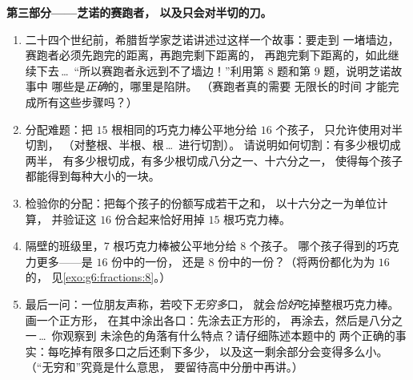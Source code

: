 \begin{problem}
\medskip
\noindent\textbf{第三部分——芝诺的赛跑者，
以及只会对半切的刀。}
\begin{enumerate}[resume]
  \item 二十四个世纪前，希腊哲学家芝诺讲述过这样一个故事：要走到
        一堵墙边，赛跑者必须先跑完的距离，再跑完剩下距离的，
        再跑完剩下距离的，如此继续下去\,\dots\
        “所以赛跑者永远到不了墙边！”利用第 8 题和第 9 题，说明芝诺故事中
        哪些是\emph{正确}的，哪里是陷阱。
        （赛跑者真的需要
        无限长的时间
        才能完成所有这些步骤吗？）
  \item 分配难题：把 $15$ 根相同的巧克力棒公平地分给 $16$ 个孩子，
        只允许使用对半切割，
        （对整根、半根、根\,\dots\ 进行切割）。
        请说明如何切割：有多少根切成两半，
        有多少根切成，有多少根切成八分之一、十六分之一，
        使得每个孩子都能得到每种大小的一块。
  \item 检验你的分配：把每个孩子的份额写成若干之和，
        以十六分之一为单位计算，
        并验证这 $16$ 份合起来恰好用掉 $15$ 根巧克力棒。
  \item 隔壁的班级里，$7$ 根巧克力棒被公平地分给 $8$ 个孩子。
        哪个孩子得到的巧克力更多——是 $16$ 份中的一份，
        还是 $8$ 份中的一份？（将两份都化为为 $16$ 的，
        见\cref{exo:g6:fractions:8}。）
  \item 最后一问：一位朋友声称，若咬下\emph{无穷多}口，
        就会\emph{恰好}吃掉整根巧克力棒。画一个正方形，
        在其中涂出各口：先涂去正方形的，
        再涂去，然后是八分之一\,\dots\ 你观察到
        未涂色的角落有什么特点？请仔细陈述本题中的
        两个正确的事实：每吃掉有限多口之后还剩下多少，
        以及这一剩余部分会变得多么小。
        （“无穷和”究竟是什么意思，
        要留待高中分册中再讲。）
\end{enumerate}
\end{problem}
